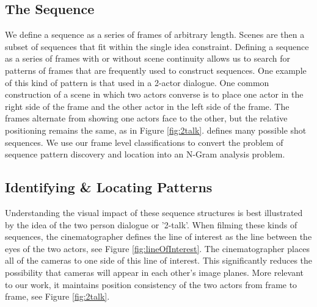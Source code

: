 \subsection*{The Sequence}
We define a sequence as a series of frames of arbitrary length. Scenes are then a subset of sequences that fit within the single idea constraint. Defining a sequence as a series of frames with or without scene continuity allows us to search for patterns of frames that are frequently used to construct sequences. One example of this kind of pattern is that used in a 2-actor dialogue. One common construction of a scene in which two actors converse is to place one actor in the right side of the frame and the other actor in the left side of the frame. The frames alternate from showing one actors face to the other, but the relative positioning remains the same, as in Figure \ref{fig:2talk}. \cite{arijon_grammar_1991} defines many possible shot sequences. We use our frame level classifications to convert the problem of sequence pattern discovery and location into an N-Gram analysis problem.


\subsection*{Identifying \& Locating Patterns}
Understanding the visual impact of these sequence structures is best illustrated by the idea of the two person dialogue or '2-talk'. When filming these kinds of sequences, the cinematographer defines the line of interest as the line between the eyes of the two actors, see Figure \ref{fig:lineOfInterest}. The cinematographer places all of the cameras to one side of this line of interest. This significantly reduces the possibility that cameras will appear in each other's image planes. More relevant to our work, it maintains position consistency of the two actors from frame to frame, see Figure \ref{fig:2talk}. 

